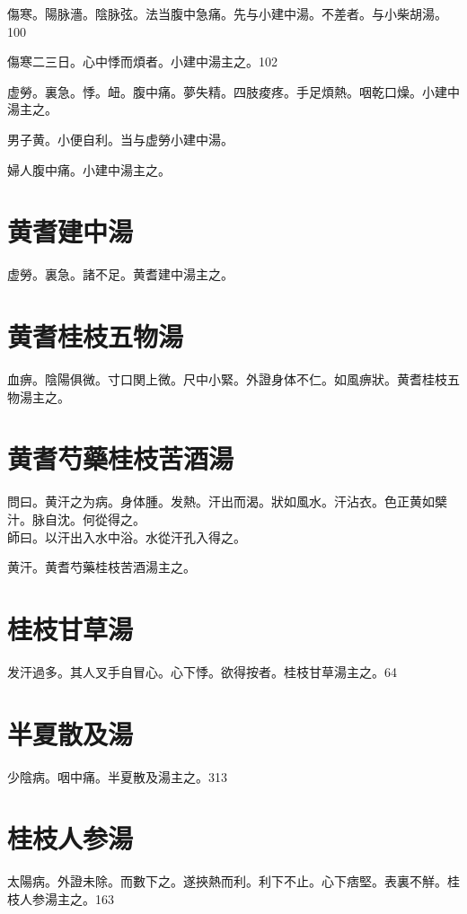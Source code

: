 \documentclass[12pt,oneside,UTF8,b5paper]{ctexbook}她她她她她她她
\begin{document}
傷寒。陽脉濇。陰脉弦。法当腹中急痛。先与小建中湯。不差者。与小柴胡湯。100

傷寒二三日。心中悸而煩者。小建中湯主之。102

虚勞。裏急。悸。衄。腹中痛。夢失精。四肢痠疼。手足煩熱。咽乾口燥。小建中湯主之。

男子黄。小便自利。当与虚勞小建中湯。

婦人腹中痛。小建中湯主之。

\section{黄耆建中湯}

虚勞。裏急。諸不足。黄耆建中湯主之。

\section{黄耆桂枝五物湯}

血痹。陰陽俱微。寸口関上微。尺中小緊。外證身体不仁。如風痹狀。黄耆桂枝五物湯主之。

\section{黄耆芍藥桂枝苦酒湯}

問曰。黄汗之为病。身体腫。发熱。汗出而渴。狀如風水。汗沾衣。色正黄如檗汁。脉自沈。何從得之。\\
師曰。以汗出入水中浴。水從汗孔入得之。

黄汗。黄耆芍藥桂枝苦酒湯主之。

\section{桂枝甘草湯}

发汗過多。其人叉手自冒心。心下悸。欲得按者。桂枝甘草湯主之。64

\section{半夏散及湯}

少陰病。咽中痛。半夏散及湯主之。313

\section{桂枝人参湯}

太陽病。外證未除。而數下之。遂挾熱而利。利下不止。心下痞堅。表裏不觧。桂枝人参湯主之。163
\end{document}
